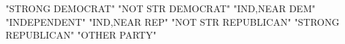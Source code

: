\begin{Schunk}
\begin{Soutput}
[1] "STRONG DEMOCRAT"    "NOT STR DEMOCRAT"   "IND,NEAR DEM"       "INDEPENDENT"        "IND,NEAR REP"       "NOT STR REPUBLICAN" "STRONG REPUBLICAN"  "OTHER PARTY"       
\end{Soutput}
\end{Schunk}
